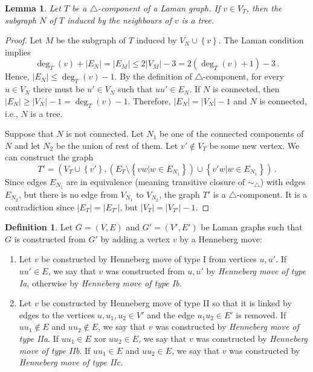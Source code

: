 \documentclass[a4paper, 11pt]{article}
\newcommand{\trcomp}{$\triangle$-component}
\newtheorem{lem}[thm]{Lemma}
\theoremstyle{definition}
\newtheorem{defn}{Definition}[section]
\begin{document}
\begin{lem}
\label{lem:neigboursInduceTree}
Let $T$ be a \trcomp{} of a Laman graph. If $v\in V_T$, then the subgraph $N$ of $T$ induced by the neighbours of $v$ is a tree.
\end{lem}
\begin{proof}
Let $M$ be the subgraph of $T$ induced by $V_N \cup \left\{v\right\}$. The Laman condition implies
$$
\deg_T (v)+|E_N|=|E_M| \leq 2|V_M|-3=2(\deg_T(v)+1)-3\,.
$$
Hence, $|E_N| \leq \deg_T(v)-1$.
By the definition of \trcomp{}, for every $u\in V_N$ there must be $u'\in V_N$ such that $uu' \in E_N$. If $N$ is connected, then $|E_N|\geq|V_N|-1=\deg_T(v)-1$. Therefore, $|E_N| = |V_N|-1$ and $N$ is connected, i.e., $N$ is a tree.

Suppose that $N$ is not connected. Let $N_1$ be one of the  connected components of $N$ and let $N_2$ be the union of rest of them. Let $v'\notin V_T$ be some new vertex.  We can construct the graph 
$$T'=\left(V_T\cup \left\{v'\right\}, \left(E_T\setminus \left\{vw|w\in E_{N_1}\right\}\right)\cup\left\{v'w|w\in E_{N_1}\right\}\right)\,.$$
Since edges $E_{N_1}$ are in equivalence (meaning transitive closure of $\sim_{\!\!\bigtriangleup}$) with edges $E_{N_2}$, but there is no edge from $V_{N_1}$ to $V_{N_2}$, the graph $T'$ is a \trcomp{}. It is a contradiction since $|E_T|=|E_{T'}|$, but $|V_T|=|V_{T'}|-1$.
\end{proof}

\begin{defn}
\label{def:typesOfHennebergMoves}
Let $G=(V,E)$ and $G'=(V',E')$ be Laman graphs such that $G$ is constructed from $G'$ by adding a vertex $v$ by a Henneberg move:
\begin{enumerate}[I:]
	\item Let $v$ be constructed by Henneberg move of type I from vertices $u,u'$. If $uu'\in E$, we say that $v$ was constructed from $u,u'$ by \emph{Henneberg move of type Ia}, otherwise by \emph{Henneberg move of type Ib}.
	\item Let $v$ be constructed by Henneberg move of type II so that it is linked by edges to the vertices $u,u_1,u_2 \in V'$ and the edge $u_1u_2\in E'$ is removed. If $uu_1\notin E$ and $uu_2\notin E$, we say that $v$ was constructed by \emph{Henneberg move of type IIa}. If $uu_1\in E$ xor $uu_2\in E$, we say that $v$ was constructed by \emph{Henneberg move of type IIb}. If $uu_1\in E$ and $uu_2\in E$, we say that $v$ was constructed by \emph{Henneberg move of type IIc}.
\end{enumerate}
\end{defn}
\end{document}
